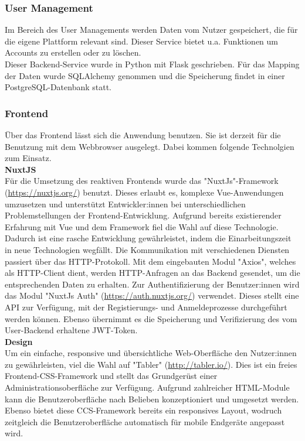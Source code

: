 \subsubsection{User Management}

Im Bereich des User Managements werden Daten vom Nutzer gespeichert, die für die eigene Plattform relevant sind. Dieser Service bietet u.a. Funktionen um Accounts zu erstellen oder zu löschen.\\
Dieser Backend-Service wurde in Python mit Flask geschrieben.
Für das Mapping der Daten wurde SQLAlchemy genommen und die Speicherung findet in einer PostgreSQL-Datenbank statt.    

\subsubsection{Frontend}

Über das Frontend lässt sich die Anwendung benutzen. Sie ist derzeit für die Benutzung mit dem Webbrowser ausgelegt. Dabei kommen folgende Technolgien zum Einsatz.  \\

\textbf{NuxtJS} \\

Für die Umsetzung des reaktiven Frontends wurde das "NuxtJs"-Framework (\href{https://nuxtjs.org/}{https://nuxtjs.org/}) benutzt. Dieses erlaubt es, komplexe Vue-Anwendungen umzusetzen und unterstützt Entwickler:innen
bei unterschiedlichen Problemstellungen der Frontend-Entwicklung. Aufgrund bereits existierender Erfahrung mit Vue und dem Framework fiel die Wahl auf diese Technologie.
Dadurch ist eine rasche Entwicklung gewährleistet, indem die Einarbeitungszeit in neue Technologien wegfällt. Die Kommunikation mit verschiedenen Diensten passiert
über das HTTP-Protokoll. Mit dem eingebauten Modul "Axios", welches als HTTP-Client dient, werden HTTP-Anfragen an das Backend gesendet, um die entsprechenden Daten 
zu erhalten. Zur Authentifizierung der Benutzer:innen wird das Modul "NuxtJs Auth" (\href{https://auth.nuxtjs.org/}{https://auth.nuxtjs.org/}) verwendet. Dieses stellt eine API zur Verfügung, mit der Registierungs- und Anmeldeprozesse durchgeführt werden können.
Ebenso übernimmt es die Speicherung und Verifizierung des vom User-Backend erhaltene JWT-Token. \\

\textbf{Design} \\

Um ein einfache, responsive und übersichtliche Web-Oberfläche den Nutzer:innen zu gewährleisten, viel die Wahl auf "Tabler" (\href{http://tabler.io/}{http://tabler.io/}). Dies ist ein freies Frontend-CSS-Framework
und stellt das Grundgerüst einer Administrationsoberfläche zur Verfügung. Aufgrund zahlreicher HTML-Module kann die Benutzeroberfläche nach Belieben konzeptioniert und 
umgesetzt werden. Ebenso bietet diese CCS-Framework bereits ein responsives Layout, wodruch zeitgleich die Benutzeroberfläche automatisch für mobile Endgeräte angepasst wird.

